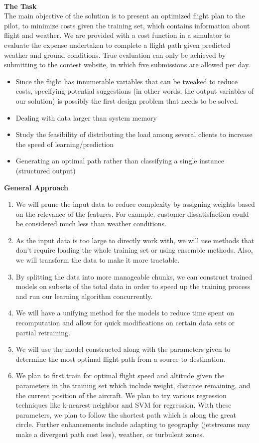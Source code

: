 \documentclass{article}[9pt]
\begin{document}
\\[\baselineskip]
\noindent
\Large{\textbf{The Task}} \\
\noindent The main objective of the solution is to present an optimized flight plan to the pilot, to minimize costs given the training set, which contains information about flight and weather. We are provided with a cost function in a simulator to evaluate the expense undertaken to complete a flight path given predicted weather and ground conditions. True evaluation can only be achieved by submitting to the contest website, in which five submissions are allowed per day.
\begin{itemize}
	\item Since the flight has innumerable variables that can be tweaked to reduce costs, specifying potential suggestions (in other words, the output variables of our solution) is possibly the first design problem that needs to be solved.
	\item Dealing with data larger than system memory
	\item Study the feasibility of distributing the load among several clients to increase the speed of learning/prediction
	\item Generating an optimal path rather than classifying a single instance (structured output)
\end{itemize}
\noindent
\Large{\textbf{General Approach}}%
\begin{enumerate}
	\item We will prune the input data to reduce complexity by assigning weights based on the relevance of the features. For example, customer dissatisfaction could be considered much less than weather conditions. 
	\item As the input data is too large to directly work with, we will use methods that don't require loading the whole training set or using ensemble methods. Also, we will transform the data to make it more tractable.
	\item By splitting the data into more manageable chunks, we can construct trained models on subsets of the total data in order to speed up the training process and run our learning algorithm concurrently.
	\item We will have a unifying method for the models to reduce time spent on recomputation and allow for quick modifications on certain data sets or partial retraining.
	\item We will use the model constructed along with the parameters given to determine the most optimal flight path from a source to destination.
	\item We plan to first train for optimal flight speed and altitude given the parameters in the training set which include weight, distance remaining, and the current position of the aircraft. We plan to try various regression techniques like k-nearest neighbor and SVM for regression. With these parameters, we plan to follow the shortest path which is along the great circle. Further enhancements include adapting to geography (jetstreams may make a divergent path cost less), weather, or turbulent zones.
\end{enumerate}
\end{document}
